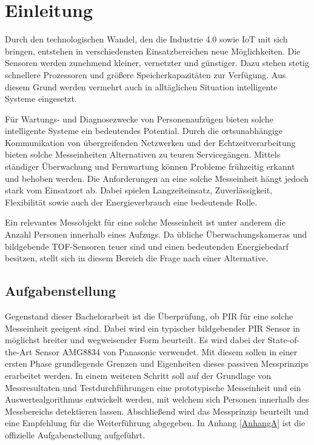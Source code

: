 \chapter{Einleitung}
\label{chap:Einleitung}


\label{sec:Ausgangssituation}
Durch den technologischen Wandel, den die Industrie 4.0 sowie \ac{IoT}  mit sich bringen, entstehen in verschiedensten Einsatzbereichen neue Möglichkeiten. Die Sensoren werden zunehmend kleiner, vernetzter und günstiger. Dazu stehen stetig schnellere Prozessoren und größere Speicherkapazitäten zur Verfügung. Aus diesem Grund werden vermehrt auch in alltäglichen Situation intelligente Systeme eingesetzt. 

Für Wartungs- und Diagnosezwecke von Personenaufzügen bieten solche intelligente Systeme ein bedeutendes Potential. Durch die ortsunabhängige Kommunikation von übergreifenden Netzwerken und der Echtzeitverarbeitung bieten solche Messeinheiten Alternativen zu teuren Servicegängen. Mittels ständiger Überwachung und Fernwartung können Probleme frühzeitig erkannt und behoben werden. Die Anforderungen an eine solche Messeinheit hängt jedoch stark vom Einsatzort ab. Dabei spielen Langzeiteinsatz, Zuverlässigkeit, Flexibilität sowie auch der Energieverbrauch eine bedeutende Rolle.

Ein relevantes Messobjekt für eine solche Messeinheit ist unter anderem die Anzahl Personen innerhalb eines Aufzugs. Da übliche Überwachungskameras und bildgebende TOF-Sensoren teuer sind und einen bedeutenden Energiebedarf besitzen, stellt sich in diesem Bereich die Frage nach einer Alternative.

\section{Aufgabenstellung}
\label{chap:Aufgabenstellung}
Gegenstand dieser Bachelorarbeit ist die Überprüfung, ob \ac{PIR} für eine solche Messeinheit geeigent sind. Dabei wird ein typischer bildgebender \ac{PIR} Sensor in möglichst breiter und wegweisender Form beurteilt. Es wird dabei der State-of-the-Art Sensor AMG8834 von Panasonic verwendet. Mit diesem sollen in einer ersten Phase grundlegende Grenzen und Eigenheiten dieses passiven Messprinzips erarbeitet werden. In einem weiteren Schritt soll auf der Grundlage von Messresultaten und Testdurchführungen eine prototypische Messeinheit und ein Auswertealgorithmus entwickelt werden, mit welchem sich Personen innerhalb des Messbereichs detektieren lassen. Abschließend wird das Messprinzip beurteilt und eine Empfehlung für die Weiterführung abgegeben. In Anhang \ref{AnhangA} ist die offizielle Aufgabenstellung aufgeführt.

